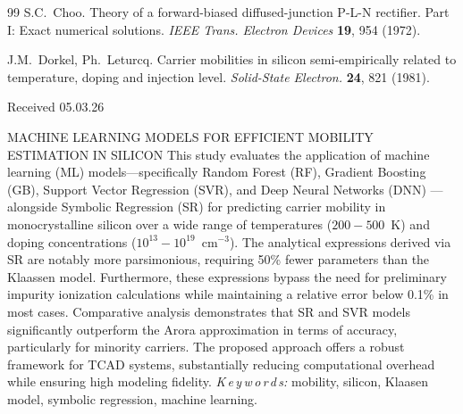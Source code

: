 \documentclass[fleqn,twoside,twocolumn,nofootinbib,showkeys]{revtex4} %
\begin{document}
\begin{thebibliography}{99}
S.C.~Choo. Theory of a forward-biased diffused-junction P-L-N rectifier. Part I: Exact numerical solutions.
\textit{IEEE Trans. Electron Devices} \textbf{19}, 954 (1972).

J.M.~Dorkel, Ph.~Leturcq.
Carrier mobilities in silicon semi-empirically related to temperature, doping and injection level.
\textit{Solid-State Electron.} \textbf{24}, 821 (1981).


\begin{flushright}
{\footnotesize Received 05.03.26}
\end{flushright}
\end{thebibliography}

\vspace*{-5mm}  {MACHINE LEARNING MODELS FOR EFFICIENT MOBILITY ESTIMATION IN SILICON} 
{
This study evaluates the application of machine learning (ML) models—specifically 
Random Forest (RF), Gradient Boosting (GB), Support Vector Regression (SVR), 
and Deep Neural Networks (DNN) --- alongside Symbolic Regression (SR) for predicting carrier mobility in monocrystalline silicon 
over a wide range of temperatures ($200-500$~K) and doping concentrations ($10^{13}-10^{19}$~cm$^{-3}$).
The analytical expressions derived via SR are notably more parsimonious, 
requiring 50\% fewer parameters than the Klaassen model. 
Furthermore, these expressions bypass the need for preliminary impurity ionization calculations 
while maintaining a relative error below 0.1\% in most cases. 
Comparative analysis demonstrates that SR and SVR models significantly outperform the Arora approximation in terms of accuracy, 
particularly for minority carriers. 
The proposed approach offers a robust framework for TCAD systems, 
substantially reducing computational overhead while ensuring high modeling fidelity.
}
{\textit{K\,e\,y\,w\,o\,r\,d\,s:} 
mobility, silicon, Klaasen model,
symbolic regression, machine learning.
}
\end{document}

